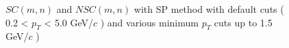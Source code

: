 	\begin{figure}[htbp]
            \begin{center}
              \end{center}
              \caption{$SC(m,n)$ and $NSC(m,n)$ with SP method with default cuts ( 0.2 < $p_T$ < 5.0 GeV/$c$ ) and various minimum $p_T$ cuts up to 1.5 GeV/$c$ )}
              \label{fig:SC_pt_withSP_higher}
       \end{figure}



